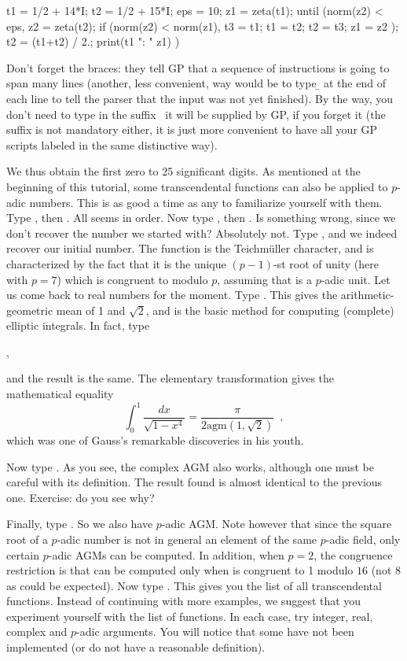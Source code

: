 \bprog\obr
\q t1 = 1/2 + 14*I;
\q t2 = 1/2 + 15*I; eps = 10;
\q z1 = zeta(t1);
\q until (norm(z2) < eps,
\q\q  z2 = zeta(t2);
\q\q  if (norm(z2) < norm(z1),
\q\q\q  t3 = t1; t1 = t2; t2 = t3; z1 = z2
\q\q  );
\q\q  t2 = (t1+t2) / 2.;
\q\q  print(t1 ": " z1)
\q )
\cbr\eprog

Don't forget the braces: they tell GP that a sequence of instructions is going
to span many lines (another, less convenient, way would be to type \b{} at the
end of each line to tell the parser that the input was not yet finished).
By the way, you don't need to type in the suffix~ it will be
supplied by GP, if you forget it (the suffix is not mandatory either, it is
just more convenient to have all your GP scripts labeled in the same
distinctive way).

We thus obtain the first zero to 25 significant digits.
\medskip
%
As mentioned at the beginning of this tutorial, some transcendental functions
can also be applied to $p$-adic numbers. This is as good a time as any to
familiarize yourself with them. Type , then
. All seems in order. Now type ,
then . Is something wrong, since we don't recover the number we
started with? Absolutely not. Type
 ,
and we indeed recover our initial number. The function 
is the Teichm\"uller character, and is characterized by the fact that it is
the unique \hbox{$(p-1)$-st} root of unity (here with $p=7$) which is
congruent to  modulo $p$, assuming that  is a $p$-adic
unit.\smallskip
%
Let us come back to real numbers for the moment. Type .
This gives the arithmetic-geometric mean of 1 and $\sqrt2$, and is the basic
method for computing (complete) elliptic integrals. In fact, type

,

\noindent and the result is the same. The elementary transformation
 gives the mathematical equality
$$\int_0^1 \dfrac{dx}{\sqrt{1-x^4}} = \dfrac{\pi}{2\text{agm}(1,\sqrt2)}
\enspace,$$
which was one of Gauss's remarkable discoveries in his youth.

Now type . As you see, the complex AGM also works,
although one must be careful with its definition. The result found is
almost identical to the previous one. Exercise: do you see why?

Finally, type . So we also have $p$-adic
AGM. Note however that since the square root of a $p$-adic number is not
in general an element of the same $p$-adic field,
only certain $p$-adic AGMs can be computed. In addition,
when $p=2$, the congruence restriction is that  can be computed
only when  is congruent to 1 modulo $16$ (not 8 as could be
expected).\smallskip
%
Now type . This gives you the list of all transcendental functions.
Instead of continuing with more examples, we suggest that you experiment
yourself with the list of functions. In each case, try integer, real, complex
and $p$-adic arguments. You will notice that some have not been implemented
(or do not have a reasonable definition).

